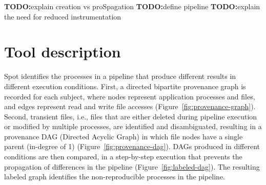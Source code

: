\documentclass[a4paper,num-refs]{oup-contemporary}
\newcommand{\todo}[1]{\color{red}\textbf{TODO:}#1\color{black}}
\newcommand{\toolname}[0]{Spot\xspace}
\begin{document}
\todo{explain creation vs proSpagation}
\todo{define pipeline}
\todo{explain the need for reduced instrumentation}

\newpage

\section{Tool description}

\toolname identifies the processes in a pipeline that produce different
results in different execution conditions. First, a directed
bipartite provenance graph is recorded for each subject, where nodes
represent application processes and files, and edges represent read and
write file accesses (Figure~\ref{fig:provenance-graph}). Second,
transient files, i.e., files that are either deleted during pipeline
execution or modified by multiple processes, are identified and
disambiguated, resulting in a provenance DAG (Directed Acyclic
Graph) in which file nodes have a single parent (in-degree of 1) (Figure~\ref{fig:provenance-dag}). 
DAGs produced in different conditions are then compared, in
a step-by-step execution that prevents the propagation of differences in the pipeline (Figure~\ref{fig:labeled-dag}).
 The resulting labeled graph identifies the
non-reproducible processes in the pipeline. 
\end{document}
